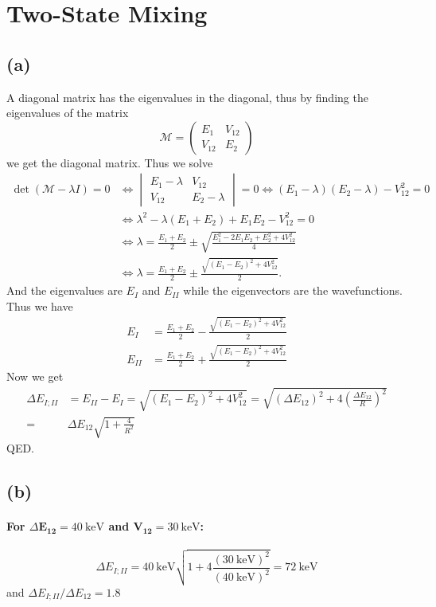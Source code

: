 \section{Two-State Mixing}
\subsection*{(a)}
A diagonal matrix has the eigenvalues in the diagonal, thus by finding the eigenvalues of the matrix
\begin{equation}
	\mathcal{M} = \begin{pmatrix}
		E_1 & V_{12} \\
		V_{12} & E_2
	\end{pmatrix}
\end{equation}
we get the diagonal matrix. Thus we solve
\begin{align}
	\det(\mathcal{M} - \lambda I) = 0 &\iff 
	\begin{vmatrix}
		E_1 - \lambda & V_{12}\\
		V_{12} & E_2 - \lambda
	\end{vmatrix} = 0 \iff (E_1 - \lambda)(E_2 - \lambda ) - V_{12}^2 = 0\\
	&\iff \lambda^2  -\lambda (E_1 + E_2) + E_1 E_2 - V_{12}^2 = 0\\
	&\iff \lambda = \frac{E_1 + E_2}{2} \pm \sqrt{ \frac{E_1^2 - 2 E_1 E_2 + E_2^2 + 4 V_{12}^2}{4}}\\
	&\iff \lambda = \frac{E_1 + E_2}{2} \pm \frac{\sqrt{(E_1 - E_2)^2 + 4 V_{12}^2}}{2}.
\end{align}
And the eigenvalues are $E_I$ and $E_{II}$ while the eigenvectors are the wavefunctions. Thus we have
\begin{align}
	E_I &= \frac{E_1 + E_2}{2} - \frac{\sqrt{(E_1 - E_2)^2 + 4V_{12}^2}}{2}\\
	E_{II} &= \frac{E_1 + E_2}{2} + \frac{\sqrt{(E_1 - E_2)^2 + 4V_{12}^2}}{2}
\end{align}
Now we get
\begin{align}
	\Delta E_{I;II} &= E_{II} - E_I = \sqrt{(E_1 - E_2)^2 + 4V_{12}^2} = \sqrt{(\Delta E_{12})^2 + 4 \left(\frac{\Delta E_{12}}{R}\right)^2}\\
	=& \Delta E_{12} \sqrt{1 + \frac{4}{R^2}}
\end{align}
QED.

\subsection*{(b)}
\paragraph{For $\Delta \bm{E_{12}} = \SI{40}{\kilo\electronvolt}$ and $\bm{V_{12}} = \SI{30}{\kilo\electronvolt}$:}
\begin{equation}
	\Delta E_{I;II} = \SI{40}{\kilo\electronvolt} \sqrt{1 + 4\frac{(\SI{30}{\kilo\electronvolt})^2}{(\SI{40}{\kilo\electronvolt})^2}} = \SI{72}{\kilo\electronvolt}
\end{equation}
and $\Delta E_{I;II} / \Delta E_{12} = 1.8$

